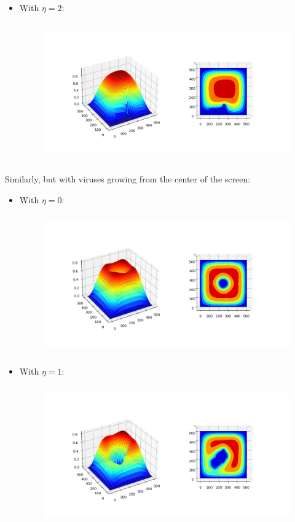 \documentclass[a4paper,10pt,notitlepage]{article}
\begin{document}
{{{{\begin{itemize}
\begin{figure}[h]
    \end{figure}
    \item  With $\eta = 2$:
    \begin{figure}[h]
        \centering
        \includegraphics[trim=70pt 40pt 100pt 60pt, clip, height = 6cm]{500x500p2plot.png}
    \end{figure}
\end{itemize}
\newpage
Similarly, but with viruses growing from the center of the screen:
\begin{itemize}
    \item With $\eta = 0$:
    \begin{figure}[h]
        \centering
        \includegraphics[trim=70pt 40pt 100pt 60pt, clip, height = 6cm]{500x500p0plot-mid.png}
    \end{figure}
    \item  With $\eta = 1$:
    \begin{figure}[h]
        \centering
        \includegraphics[trim=70pt 40pt 100pt 60pt, clip, height = 6cm]{500x500p1plot-mid.png}

\end{figure}
\end{itemize}}}}}
\end{document}
